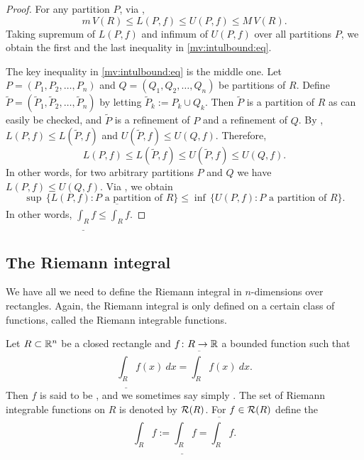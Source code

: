 \begin{proof}
For any partition $P$, via ,
\begin{equation*}
m\,V(R) \leq L(P,f) \leq U(P,f) \leq M\,V(R).
\end{equation*}
Taking supremum of $L(P,f)$ and infimum of $U(P,f)$ over all partitions $P$,
we obtain the first and the last inequality in
\eqref{mv:intulbound:eq}.

The key inequality in
\eqref{mv:intulbound:eq}
is the middle one.
Let $P=(P_1,P_2,\ldots,P_n)$ and
$Q=(Q_1,Q_2,\ldots,Q_n)$
be partitions of $R$.  Define 
$\widetilde{P} = ( \widetilde{P}_1,\widetilde{P}_2,\ldots,\widetilde{P}_n )$
by letting
$\widetilde{P}_k := P_k \cup Q_k$.
Then $\widetilde{P}$ is a partition of $R$ as can easily be checked,
and $\widetilde{P}$ is a refinement of $P$ and a refinement of $Q$.
By ,
$L(P,f) \leq L(\widetilde{P},f)$ and
$U(\widetilde{P},f) \leq U(Q,f)$.  Therefore,
\begin{equation*}
L(P,f) \leq L(\widetilde{P},f) \leq U(\widetilde{P},f) \leq U(Q,f) .
\end{equation*}
In other words, for two arbitrary partitions $P$ and $Q$ we have
$L(P,f) \leq U(Q,f)$.  
Via ,
we obtain
\begin{equation*}
\sup \, \bigl\{ L(P,f) : P \text{ a partition of } R \bigl\}
\leq
\inf \, \bigl\{ U(P,f) : P \text{ a partition of } R \bigl\} .
\end{equation*}
In other words, $\underline{\int_R} f \leq \overline{\int_R} f$.
\end{proof}

\subsection{The Riemann integral}

We have all we need to
define the Riemann integral in $n$-dimensions over rectangles.
Again, the Riemann
integral is only defined on a certain class of functions, called the
Riemann integrable functions.

\begin{defn}
Let $R \subset {\mathbb{R}}^n$ be a closed rectangle and
$f \colon R \to {\mathbb{R}}$ a bounded function such that
\begin{equation*}
\underline{\int_R} f(x)~dx = \overline{\int_R} f(x)~dx .
\end{equation*}
Then $f$ is said to be \emph{},
and we sometimes say simply \emph{}.
The set of Riemann integrable functions on $R$ is denoted
by ${\mathcal{R}}(R)$.
For $f \in {\mathcal{R}}(R)$ define
the \emph{}
\begin{equation*}
\int_R f := 
\underline{\int_R} f = \overline{\int_R} f .
\end{equation*}
\end{defn}


